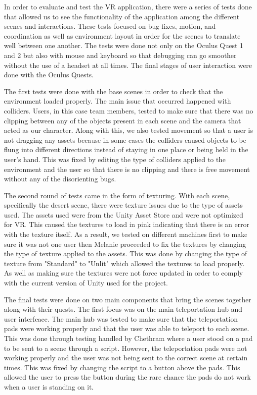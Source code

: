 \documentclass{vgtc}                          %
\begin{document}
In order to evaluate and test the VR application, there were a series of tests done that allowed us to see the functionality of the application among the different scenes and interactions. These tests focused on bug fixes, motion, and coordination as well as environment
layout in order for the scenes to translate well between one another. The tests were done not only on the Oculus Quest 1 and 2 but also with mouse and keyboard so that debugging can go smoother without the use of a headset at all times. The final stages of user interaction
were done with the Oculus Quests.

The first tests were done with the base scenes in order to check that the environment loaded properly. The main issue that occurred happened with colliders. Users, in this case team members, tested to make sure that there was no clipping between any of the objects present in each scene and the camera that
acted as our character. Along with this, we also tested movement so that a user is not dragging any assets because in some cases the colliders caused objects to be flung into different directions instead of staying in one place or being held in the user's hand. This was fixed by editing the type of colliders
applied to the environment and the user so that there is no clipping and there is free movement without any of the disorienting bugs.

The second round of tests came in the form of texturing. With each scene, specifically the desert scene, there were texture issues due to the type of assets used. The assets used were from the Unity Asset Store and were not optimized for VR. This caused the textures to load in pink indicating that there is an error
with the texture itself. As a result, we tested on different machines first to make sure it was not one user then Melanie proceeded to fix the textures by changing the type of texture applied to the assets. This was done by changing the type of texture from "Standard" to "Unlit" which allowed the textures to load properly. As well as making
sure the textures were not force updated in order to comply with the current version of Unity used for the project.


The final tests were done on two main components that bring the scenes together along with their quests. The first focus was on the main teleportation hub and user interfeace. The main hub was tested to make sure that the teleportation pads were working properly and that the user was able to teleport to each scene. This was done through testing handled by Chethram where
a user stood on a pad to be sent to a scene through a script. However, the teleportation pads were not working properly and the user was not being sent to the correct scene at certain times. This was fixed by changing the script to a button above the pads. This allowed the user to press the button during the rare chance the pads do not work when a user is standing on it.
\end{document}
